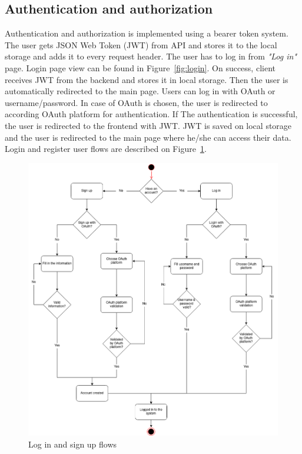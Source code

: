 \subsection{Authentication and authorization}\label{subsec:authentication-and-authorization}
Authentication and authorization is implemented using a bearer token system.
The user gets JSON Web Token (JWT) from API and stores it to the local storage and adds it to every request header.
The user has to log in from \textit{"Log in"} page.
Login page view can be found in Figure~\ref{fig:login}.
On success, client receives JWT from the backend and stores it in local storage.
Then the user is automatically redirected to the main page.
Users can log in with OAuth or username/password.
In case of OAuth is chosen, the user is redirected to according OAuth platform for authentication.
If The authentication is successful, the user is redirected to the frontend with JWT.
JWT is saved on local storage and the user is redirected to the main page where he/she can access their data.
Login and register user flows are described on Figure~\ref{fig:login-signup-diagram}.

\begin{figure}[H]
    \includegraphics[width=\textwidth]{figures/login_signup_user_flow}
    \caption{Log in and sign up flows}
    \label{fig:login-signup-diagram}
\end{figure}

